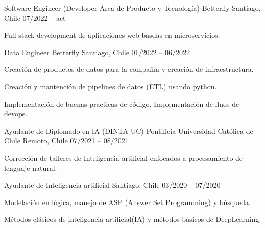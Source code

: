 \begin{cventries}
\cventry
{Software Engineer (Developer Área de Producto y Tecnología)} %
{Betterfly} %
{Santiago, Chile} %
{07/2022 – act} %
{
  \begin{cvitems} %
    \item {Full stack development de aplicaciones web basdas en microservicios.}
  \end{cvitems}
}
\newline
\cventry
  {Data Engineer} %
  {Betterfly} %
  {Santiago, Chile} %
  {01/2022 – 06/2022} %
  {
    \begin{cvitems} %
      \item {Creación de productos de datos para la compañía y creación de infraestructura.}
      \item {Creación y mantención de pipelines de datos (ETL) usando python.}
      \item {Implementación de buenas practicas de código. Implementación de fluos de devops.}
    \end{cvitems}
  }
  \newline
\cventry
  {Ayudante de Diplomado en IA (DINTA UC)} %
  {Pontificia Universidad Católica de Chile} %
  {Remoto, Chile} %
  {07/2021 – 08/2021} %
  {
    \begin{cvitems} %
      \item {Corrección de talleres de Inteligencia artificial enfocados a procesamiento de lenguaje natural.}
    \end{cvitems}
  }
  \newline
  \cventry
    {Ayudante de Inteligencia artificial} %
    {} %
    {Santiago, Chile} %
    {03/2020 – 07/2020} %
    {
      \begin{cvitems} %
        \item {Modelación en lógica, manejo de ASP (Answer Set Programming) y búsqueda.}
        \item {Métodos clásicos de inteligencia artificial(IA) y métodos básicos de DeepLearning.}
      \end{cvitems}
    }
    \newline


\end{cventries}
